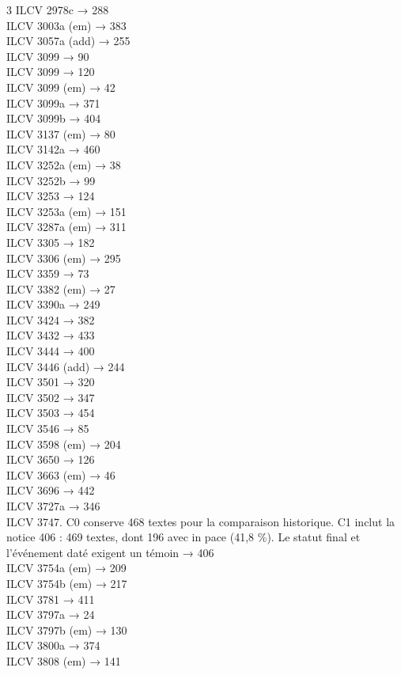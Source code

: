 \begin{multicols}{3}
ILCV 2978c → 288\\
ILCV 3003a (em) → 383\\
ILCV 3057a (add) → 255\\
ILCV 3099 → 90\\
ILCV 3099 → 120\\
ILCV 3099 (em) → 42\\
ILCV 3099a → 371\\
ILCV 3099b → 404\\
ILCV 3137 (em) → 80\\
ILCV 3142a → 460\\
ILCV 3252a (em) → 38\\
ILCV 3252b → 99\\
ILCV 3253 → 124\\
ILCV 3253a (em) → 151\\
ILCV 3287a (em) → 311\\
ILCV 3305 → 182\\
ILCV 3306 (em) → 295\\
ILCV 3359 → 73\\
ILCV 3382 (em) → 27\\
ILCV 3390a → 249\\
ILCV 3424 → 382\\
ILCV 3432 → 433\\
ILCV 3444 → 400\\
ILCV 3446 (add) → 244\\
ILCV 3501 → 320\\
ILCV 3502 → 347\\
ILCV 3503 → 454\\
ILCV 3546 → 85\\
ILCV 3598 (em) → 204\\
ILCV 3650 → 126\\
ILCV 3663 (em) → 46\\
ILCV 3696 → 442\\
ILCV 3727a → 346\\
ILCV 3747. C0 conserve 468 textes pour la comparaison historique. C1 inclut la notice 406 : 469 textes, dont 196 avec in pace (41,8 \%). Le statut final et l’événement daté exigent un témoin → 406\\
ILCV 3754a (em) → 209\\
ILCV 3754b (em) → 217\\
ILCV 3781 → 411\\
ILCV 3797a → 24\\
ILCV 3797b (em) → 130\\
ILCV 3800a → 374\\
ILCV 3808 (em) → 141\\

\end{multicols}
